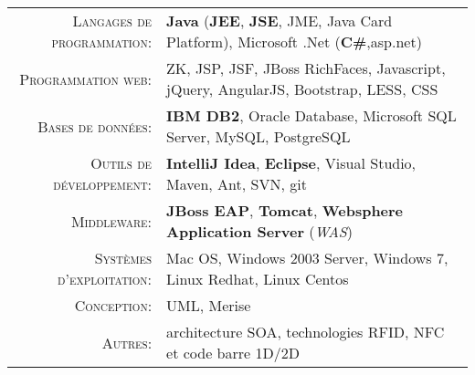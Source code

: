 \renewcommand{\arraystretch}{1.1}

	\begin{tabular}{>{\small}r>{\small}p{13cm}} 
		\textsc{Langages de programmation:}  		&   \textbf{Java} (\textbf{JEE}, \textbf{JSE}, JME, Java Card Platform), Microsoft .Net (\textbf{C\#},asp.net)\\ 
		\textsc{Programmation web:}               	&   ZK, JSP, JSF, JBoss RichFaces, Javascript, jQuery, AngularJS, Bootstrap, LESS, CSS\\ 
		\textsc{Bases de données:}                  &   \textbf{IBM DB2}, Oracle Database, Microsoft SQL Server, MySQL, PostgreSQL \\ 
		\textsc{Outils de développement:}	  		&   \textbf {IntelliJ Idea}, \textbf {Eclipse}, Visual Studio, Maven, Ant, SVN, git\\
		\textsc{Middleware:}				        &   \textbf{JBoss EAP}, \textbf{Tomcat}, \textbf{Websphere Application Server} (\emph{WAS})\\ 
		\textsc{Systèmes d'exploitation:}	        &   Mac OS, Windows 2003 Server, Windows 7, Linux Redhat, Linux Centos\\ 
		\textsc{Conception:}				        &   UML, Merise\\
		\textsc{Autres:}					        &   architecture SOA, technologies RFID, NFC et code barre 1D/2D
	\end{tabular}